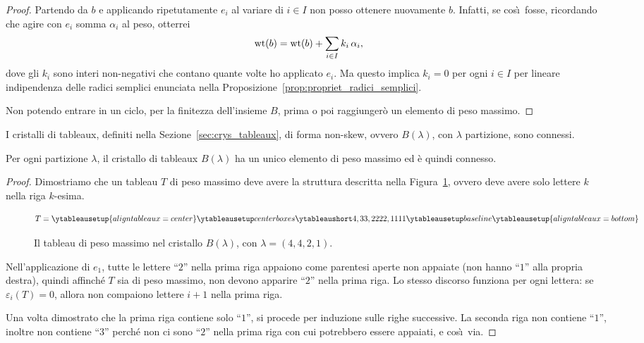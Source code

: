 \begin{proof}
    Partendo da $b$ e applicando ripetutamente $e_i$ al variare di $i \in I$ non posso
    ottenere nuovamente $b$.
    Infatti, se cos\`\i\ fosse, ricordando che agire con $e_i$ somma $\alpha_i$ al peso,
    otterrei
    \[
        \operatorname{wt}(b) = \operatorname{wt}(b) + \sum_{i\in I} k_i \, \alpha_i,
    \]
    dove gli $k_i$ sono interi non-negativi che contano quante volte ho applicato $e_i$.
    Ma questo implica $k_i = 0$ per ogni $i \in I$ per lineare indipendenza delle radici
    semplici enunciata nella Proposizione~\ref{prop:propriet_radici_semplici}.

    Non potendo entrare in un ciclo, per la finitezza dell'insieme $B$, prima o poi 
    raggiunger\`o un elemento di peso massimo.
\end{proof}

I cristalli di tableaux, definiti nella Sezione~\ref{sec:crys_tableaux}, di forma
non-skew, ovvero $B(\lambda)$, con $\lambda$ partizione, sono connessi.

\begin{proposition}
    Per ogni partizione $\lambda$, il cristallo di tableaux $B(\lambda)$ ha un unico
    elemento di peso massimo ed \`e quindi connesso.
\end{proposition}

\begin{proof}
    Dimostriamo che un tableau $T$ di peso massimo deve avere la struttura descritta nella
    Figura~\ref{fig:tab_massimo}, ovvero deve avere solo lettere $k$ nella riga $k$-esima.

    \begin{figure}[htbp]
        \[
            T = 
            \ytableausetup{aligntableaux=center}
            \ytableaunumber{
                4,
                3 3,
                2 2 2 2,
                1 1 1 1
            }
            \ytableausetup{aligntableaux=bottom}
        \]
        \caption{Il tableau di peso massimo nel cristallo $B(\lambda)$, con
        $\lambda = (4, 4, 2, 1)$. }
        \label{fig:tab_massimo}
    \end{figure}

    Nell'applicazione di $e_1$, tutte le lettere ``$2$'' nella prima riga appaiono come parentesi
    aperte non appaiate (non hanno ``$1$'' alla propria destra),
    quindi affinch\'e $T$ sia di peso massimo, non devono apparire
    ``$2$'' nella prima riga.
    Lo stesso discorso funziona per ogni lettera: se $\varepsilon_i(T) = 0$, allora
    non compaiono lettere $i+1$ nella prima riga.

    Una volta dimostrato che la prima riga contiene solo ``$1$'', si procede per 
    induzione sulle righe successive.
    La seconda riga non contiene ``$1$'', inoltre non contiene ``$3$'' perch\'e non ci sono
    ``$2$'' nella prima riga con cui potrebbero essere appaiati, e cos\`\i\ via.
\end{proof}

